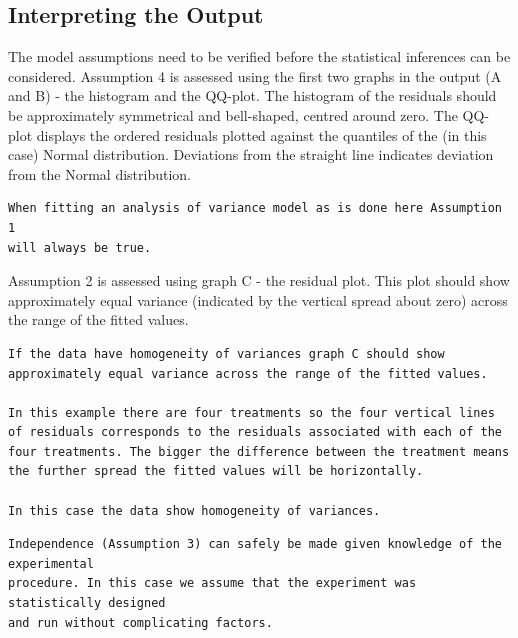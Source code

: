 \documentclass[a4paper, 10pt, fleqn, twosided]{memoir}
\begin{document}
\subsection{Interpreting the Output}

The model assumptions need to be verified before the statistical inferences can be considered. Assumption 4 is assessed
using the first two graphs in the output (A and B) - the histogram and the QQ-plot. The histogram of the residuals
should be approximately symmetrical and bell-shaped, centred around zero. The QQ-plot displays the ordered residuals
plotted against the quantiles of the (in this case) Normal distribution. Deviations from the straight line indicates
deviation from the Normal distribution.

\begin{tcolorbox}[title = Example 1 Assumption 1]
\begin{verbatim}
When fitting an analysis of variance model as is done here Assumption 1
will always be true.
\end{verbatim}
\end{tcolorbox}


Assumption 2 is assessed using graph C - the residual plot. This plot should show approximately equal variance
(indicated by the vertical spread about zero) across the range of the fitted values.

\begin{tcolorbox}[title = Example 1 Assumption 2]
\begin{verbatim}
If the data have homogeneity of variances graph C should show
approximately equal variance across the range of the fitted values.

In this example there are four treatments so the four vertical lines
of residuals corresponds to the residuals associated with each of the
four treatments. The bigger the difference between the treatment means
the further spread the fitted values will be horizontally.

In this case the data show homogeneity of variances.
\end{verbatim}
\end{tcolorbox}

\begin{tcolorbox}[title = Example 1 Assumption 3]
\begin{verbatim}
Independence (Assumption 3) can safely be made given knowledge of the experimental
procedure. In this case we assume that the experiment was statistically designed
and run without complicating factors.
\end{verbatim}
\end{tcolorbox}
\end{document}
